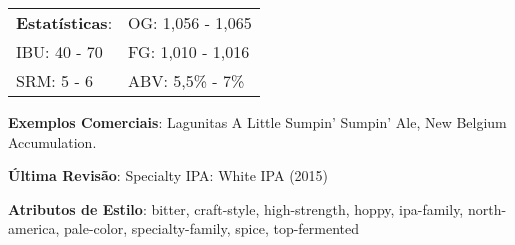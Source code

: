 \begin{tabular}{@{}p{35mm}p{35mm}@{}}
  \textbf{Estatísticas}: & OG: 1,056 - 1,065 \\
  IBU: 40 - 70  & FG: 1,010 - 1,016 \\
  SRM: 5 - 6  & ABV: 5,5\% - 7\%
\end{tabular}

\textbf{Exemplos Comerciais}: Lagunitas A Little Sumpin' Sumpin' Ale, New Belgium Accumulation.

\textbf{Última Revisão}: Specialty IPA: White IPA (2015)

\textbf{Atributos de Estilo}: bitter, craft-style, high-strength, hoppy, ipa-family, north-america, pale-color, specialty-family, spice, top-fermented
